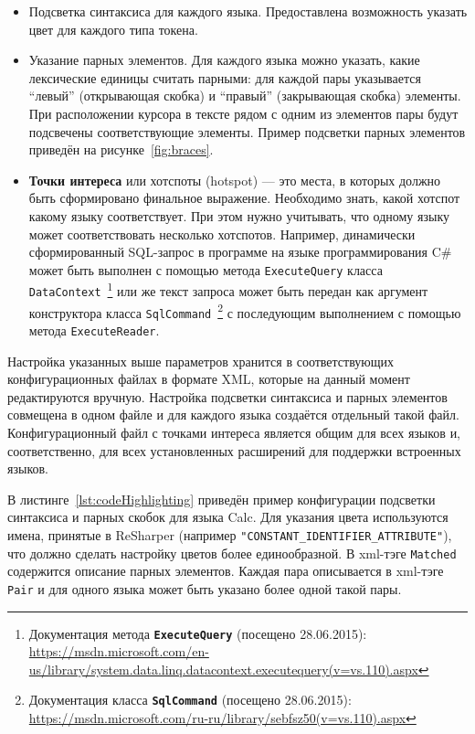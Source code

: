 \begin{itemize}
    \item Подсветка синтаксиса для каждого языка. Предоставлена возможность указать цвет для каждого типа токена.
    \item Указание парных элементов. Для каждого языка можно указать, какие лексические единицы считать парными: для каждой пары указывается ``левый'' (открывающая скобка) и ``правый'' (закрывающая скобка) элементы. При расположении курсора в тексте рядом с одним из элементов пары будут подсвечены соответствующие элементы. Пример подсветки парных элементов приведён на рисунке~\ref{fig:braces}.
    \item \textbf{Точки интереса} или хотспоты (hotspot) --- это места, в которых должно быть сформировано финальное выражение. Необходимо знать, какой хотспот какому языку соответствует. При этом нужно учитывать, что одному языку может соответствовать несколько хотспотов. Например, динамически сформированный SQL-запрос в программе на языке программирования C\# может быть выполнен с помощью метода \verb|ExecuteQuery| класса \verb|DataContext|~\footnote{Документация метода \textbf{\texttt{ExecuteQuery}} (посещено 28.06.2015): \url{https://msdn.microsoft.com/en-us/library/system.data.linq.datacontext.executequery(v=vs.110).aspx}} или же текст запроса может быть передан как аргумент конструктора класса \verb|SqlCommand|~\footnote{Документация класса \textbf{\texttt{SqlCommand}} (посещено 28.06.2015): \url{https://msdn.microsoft.com/ru-ru/library/sebfsz50(v=vs.110).aspx}} с последующим выполнением с помощью метода \verb|ExecuteReader|.

\end{itemize}

Настройка указанных выше параметров хранится в соответствующих конфигурационных файлах в формате XML, которые на данный момент редактируются вручную. Настройка подсветки синтаксиса и парных элементов совмещена в одном файле и для каждого языка создаётся отдельный такой файл. Конфигурационный файл с точками интереса является общим для всех языков и, соответственно, для всех установленных расширений для поддержки встроенных языков.

В листинге~\ref{lst:codeHighlighting} приведён пример конфигурации подсветки синтаксиса и парных скобок для языка Calc. Для указания цвета используются имена, принятые в ReSharper (например \verb|"CONSTANT_IDENTIFIER_ATTRIBUTE"|), что должно сделать настройку цветов более единообразной. В xml-тэге \verb|Matched| содержится описание парных элементов. Каждая пара описывается в xml-тэге \verb|Pair| и для одного языка может быть указано более одной такой пары.

